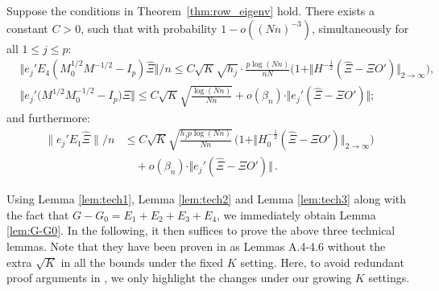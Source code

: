 \documentclass[preprint,11pt]{article}
\numberwithin{equation}{section}
\begin{document}
\begin{lemma}\label{lem:tech3}
Suppose the conditions in Theorem~\ref{thm:row_eigenv} hold. There exists a constant $C>0$, such that with probability $1- o((Nn)^{-3})$, simultaneously for all $1\leq j \leq p$:
\begin{align}
&  \Vert e_j' E_4(M_0^{1/2}M^{-1/2}-I_p) \hat \Xi  \Vert/n \leq C\sqrt{K}\sqrt{h_j} \cdot \frac{p\log (Nn)}{nN} \Big( 1 +   \Vert H^{-\frac 12}  (\hat \Xi - \Xi O') \Vert_{2\to \infty}\Big) , 
\label{eq:tech2_add}\\
&\Big\Vert e_j'  \big(M^{1/2}M_0^{-1/2} - I_p\big)\hat\Xi  \Big \Vert \leq C\sqrt{K}\sqrt{\frac{\log (Nn)}{Nn} } + o(\beta_n) \cdot \Vert e_j'(\hat \Xi - \Xi O')\Vert; \label{eq:tech3_add}
\end{align}
and furthermore:
\begin{align}
 \| e_j' E_1\hat \Xi\|/n &\leq C\sqrt{K}\sqrt{\frac{h_jp\log (Nn)}{Nn}} \, \Big(1 +  \Vert H_0^{-\frac 12} (\hat \Xi- \Xi O')\Vert_{2\to \infty} \Big)\\
 &\quad+ o(\beta_n) \cdot \Vert e_j'(\hat \Xi - \Xi O')\Vert\,.  \label{eq:tech3_entryE1}
\end{align}
\end{lemma}
Using Lemma \ref{lem:tech1}, Lemma \ref{lem:tech2} and Lemma \ref{lem:tech3} along with the fact that $G-G_0 = E_1+E_2+E_3+E_4$, we immediately obtain Lemma \ref{lem:G-G0}. In the following, it then suffices to prove the above three technical lemmas. Note that they have been proven in \cite{ke2024entry} as Lemmas A.4-4.6 without the extra $\sqrt{K}$ in all the bounds under the fixed $K$ setting. Here, to avoid redundant proof arguments in \cite{ke2024entry}, we only highlight the changes under our growing $K$ settings.
\end{document}
